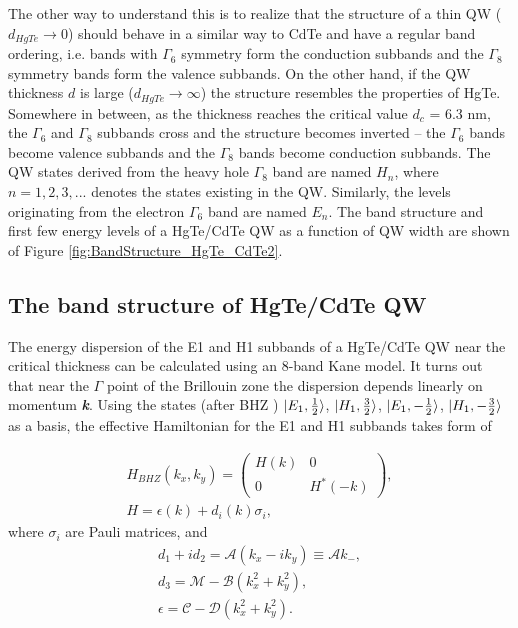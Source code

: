 \documentclass[titlepage,a4paper]{book}
\newcommand{\wciecie}{\quad\phantom{v}}
\begin{document}
The other way to understand this is to realize that the structure of a thin QW ($d_{HgTe} \rightarrow 0$) should behave in a similar way to CdTe and have a regular band ordering, i.e. bands with $\Gamma_6$ symmetry form the conduction subbands and the $\Gamma_8$ symmetry bands form the valence subbands. On the other hand, if the QW thickness $d$ is large ($d_{HgTe} \rightarrow \infty$) the structure resembles the properties of HgTe. Somewhere in between, as the thickness reaches the critical value $d_c$ = 6.3 nm, the $\Gamma_6$ and $\Gamma_8$ subbands cross and the structure becomes inverted -- the $\Gamma_6$ bands become valence subbands and the $\Gamma_8$ bands become conduction subbands. The QW states derived from the heavy hole $\Gamma_8$ band are named $H_n$, where $n = 1, 2, 3, ...$ denotes the states existing in the QW. Similarly, the levels originating from the electron $\Gamma_6$ band are named $E_n$. The band structure and first few energy levels of a HgTe/CdTe QW as a function of QW width are shown of Figure \ref{fig:BandStructure_HgTe_CdTe2}.  



\subsection{The band structure of HgTe/CdTe QW}
\wciecie
The energy dispersion of the E1 and H1 subbands of a HgTe/CdTe QW near the critical thickness can be calculated using an 8-band Kane model. It turns out that near the $\Gamma$ point of the Brillouin zone the dispersion depends linearly on momentum \textbf{\textit{k}}. Using the states (after BHZ \cite{Bernevig_Topology2}) $\ket{E_1,\frac{1}{2}}$, $\ket{H_1,\frac{3}{2}}$, $\ket{E_1,-\frac{1}{2}}$, $\ket{H_1,-\frac{3}{2}}$ as a basis, the effective Hamiltonian for the E1 and H1 subbands takes form of

\begin{equation}
\label{eq:MCT_SQW_Hamiltonian}
\begin{aligned}
H_{BHZ}(k_x, k_y) =  \left( \begin{array}{cc}
H(k) & 0 \\
0 & H^*(-k) \end{array} \right), \\
H = \epsilon (k) + d_i (k) \sigma_i,
\end{aligned}
\end{equation}
where $\sigma_i$ are Pauli matrices, and
\begin{equation}
\label{eq:MCT_SQW_Hamiltonian2}
\begin{aligned}
d_1 + id_2 = \mathcal{A}(k_x - ik_y) \equiv \mathcal{A}k_-, \\
d_3 = \mathcal{M} - \mathcal{B}(k_x^2 + k_y^2), \\
\epsilon = \mathcal{C} - \mathcal{D}(k_x^2 + k_y^2).
\end{aligned}
\end{equation}
\end{document}
